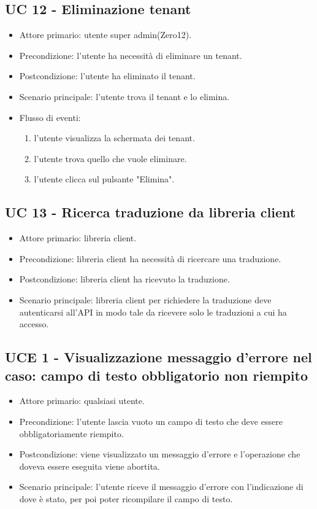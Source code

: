 \subsection{UC 12 - Eliminazione tenant}
    \begin{itemize}
        \item Attore primario: utente super admin(Zero12).
        \item Precondizione: l'utente ha necessità di eliminare un tenant.
        \item Postcondizione: l'utente ha eliminato il tenant.
        \item Scenario principale: l'utente trova il tenant e lo elimina.
        \item Flusso di eventi:
            \begin{enumerate}
                \item l'utente visualizza la schermata dei tenant.
                \item l'utente trova quello che vuole eliminare.
                \item l'utente clicca sul pulsante "Elimina".
            \end{enumerate}
    \end{itemize}
\subsection{UC 13 - Ricerca traduzione da libreria client}
    \begin{itemize}
        \item Attore primario: libreria client.
        \item Precondizione: libreria client ha necessità di ricercare una traduzione.
        \item Postcondizione: libreria client ha ricevuto la traduzione.
        \item Scenario principale: libreria client per richiedere la traduzione deve autenticarsi all'API in modo tale da ricevere solo le traduzioni a cui ha accesso.
    \end{itemize}
\subsection{UCE 1 - Visualizzazione messaggio d'errore nel caso: campo di testo obbligatorio non riempito}
    \begin{itemize}
        \item Attore primario: qualsiasi utente.
        \item Precondizione: l'utente lascia vuoto un campo di testo che deve essere obbligatoriamente riempito.
        \item Postcondizione: viene visualizzato un messaggio d'errore e l'operazione che doveva essere eseguita viene abortita.
        \item Scenario principale: l'utente riceve il messaggio d'errore con l'indicazione di dove è stato, per poi poter ricompilare il campo di testo.
    \end{itemize}
